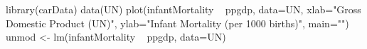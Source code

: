 \begin{Schunk}
\begin{Sinput}
 library(carData)
 data(UN)
 plot(infantMortality ~ ppgdp, data=UN, xlab="Gross Domestic Product (UN)", ylab="Infant Mortality (per 1000 births)", main="")
 unmod <- lm(infantMortality ~ ppgdp, data=UN)
\end{Sinput}
\end{Schunk}
